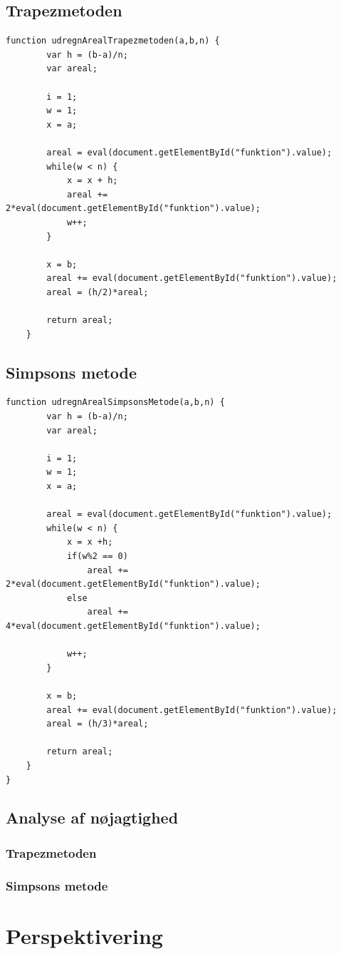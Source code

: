 \documentclass[12pt]{article}
\numberwithin{equation}{section}
\begin{document}
\subsection{Trapezmetoden}
\begin{lstlisting}[caption="udregnArealTrapezmetoden()"]
	function udregnArealTrapezmetoden(a,b,n) {
		var h = (b-a)/n;
		var areal;
		
		i = 1;
		w = 1;
		x = a;
		
		areal = eval(document.getElementById("funktion").value);
		while(w < n) {
			x = x + h;
			areal += 2*eval(document.getElementById("funktion").value);
			w++;
		}
		
		x = b;
		areal += eval(document.getElementById("funktion").value);
		areal = (h/2)*areal;
		
		return areal;
	}
\end{lstlisting}
\subsection{Simpsons metode}
\begin{lstlisting}[caption="udregnArealSimpsonsMetode()"]
	function udregnArealSimpsonsMetode(a,b,n) {
		var h = (b-a)/n;
		var areal;
		
		i = 1;
		w = 1;
		x = a;
		
		areal = eval(document.getElementById("funktion").value);
		while(w < n) {
			x = x +h;
			if(w%2 == 0)
				areal += 2*eval(document.getElementById("funktion").value);
			else
				areal += 4*eval(document.getElementById("funktion").value);
			
			w++;
		}
		
		x = b;
		areal += eval(document.getElementById("funktion").value);
		areal = (h/3)*areal;
		
		return areal;
	}
}
\end{lstlisting}
\subsection{Analyse af nøjagtighed}
\subsubsection{Trapezmetoden}
\subsubsection{Simpsons metode}

\section{Perspektivering}
\end{document}
